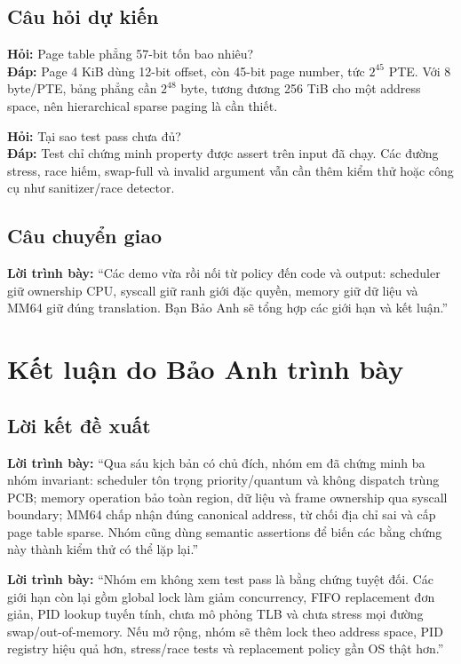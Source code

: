 \documentclass[12pt,a4paper]{article}
\newcommand{\say}[1]{\textbf{\color{bkblue}Lời trình bày:} ``#1''}
\begin{document}
\subsection{Câu hỏi dự kiến}

\textbf{Hỏi:} Page table phẳng 57-bit tốn bao nhiêu?\\
\textbf{Đáp:} Page 4 KiB dùng 12-bit offset, còn 45-bit page number, tức
\(2^{45}\) PTE. Với 8 byte/PTE, bảng phẳng cần \(2^{48}\) byte, tương đương
256 TiB cho một address space, nên hierarchical sparse paging là cần thiết.

\textbf{Hỏi:} Tại sao test pass chưa đủ?\\
\textbf{Đáp:} Test chỉ chứng minh property được assert trên input đã chạy. Các
đường stress, race hiếm, swap-full và invalid argument vẫn cần thêm kiểm thử
hoặc công cụ như sanitizer/race detector.

\subsection{Câu chuyển giao}

\say{Các demo vừa rồi nối từ policy đến code và output: scheduler giữ
ownership CPU, syscall giữ ranh giới đặc quyền, memory giữ dữ liệu và MM64 giữ
đúng translation. Bạn Bảo Anh sẽ tổng hợp các giới hạn và kết luận.}

\section{Kết luận do Bảo Anh trình bày}

\subsection{Lời kết đề xuất}

\say{Qua sáu kịch bản có chủ đích, nhóm em đã chứng minh ba nhóm invariant:
scheduler tôn trọng priority/quantum và không dispatch trùng PCB; memory
operation bảo toàn region, dữ liệu và frame ownership qua syscall boundary;
MM64 chấp nhận đúng canonical address, từ chối địa chỉ sai và cấp page table
sparse. Nhóm cũng dùng semantic assertions để biến các bằng chứng này thành
kiểm thử có thể lặp lại.}

\say{Nhóm em không xem test pass là bằng chứng tuyệt đối. Các giới hạn còn lại
gồm global lock làm giảm concurrency, FIFO replacement đơn giản, PID lookup
tuyến tính, chưa mô phỏng TLB và chưa stress mọi đường swap/out-of-memory.
Nếu mở rộng, nhóm sẽ thêm lock theo address space, PID registry hiệu quả hơn,
stress/race tests và replacement policy gần OS thật hơn.}
\end{document}
